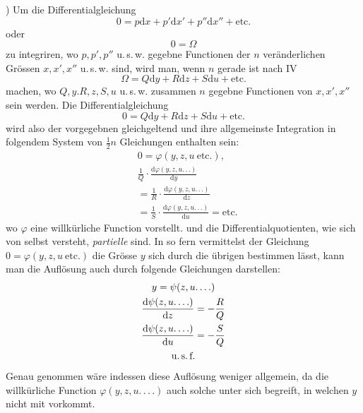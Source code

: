 ) Um die Differentialgleichung
\[
0=p\mathrm{d}x+p'\mathrm{d}x'+p''\mathrm{d}x''+\mathrm{etc.}
\]
oder
\[
0=\Omega
\]
zu integriren, wo $p,p',p''$ u.\,s.\,w. gegebne Functionen der $n$ veränderlichen
Grössen $x,x',x''$ u.\,s.\,w. sind, wird man, wenn $n$ gerade ist nach IV
\[
\Omega=Q\mathrm{d}y+R\mathrm{d}z+S\mathrm{d}u+\mathrm{etc.}
\]
machen, wo $Q,y.R,z,S,u$ u.\,s.\,w. zusammen $n$ gegebne Functionen von $x,x',x''$
sein werden. Die Differentialgleichung
\[
0=Q\mathrm{d}y+R\mathrm{d}z+S\mathrm{d}u+\mathrm{etc.}
\]
wird also der vorgegebnen gleichgeltend und ihre allgemeinste Integration in folgendem System von $\frac12 n$ Gleichungen enthalten sein:
\[
\begin{aligned}&0=\varphi(y,z,u\ \mathrm{etc.}),\\&
\frac1Q\cdot\frac{\mathrm{d}\varphi(y,z,u.\,.\,.)}{\mathrm{d}y}
\\&=\frac1R\cdot\frac{\mathrm{d}\varphi(y,z,u.\,.\,.)}{\mathrm{d}z}
\\&=\frac1S\cdot\frac{\mathrm{d}\varphi(y,z,u.\,.\,.)}{\mathrm{d}u}=\mathrm{etc.}\end{aligned}
\]
wo $\varphi$ eine willkürliche Function vorstellt. und die Differentialquotienten, wie
sich von selbst versteht, \textit{partielle} sind. In so fern vermittelst der Gleichung
$0=\varphi(y,z,u\ \mathrm{etc.})$ die Grösse $y$ sich durch die übrigen bestimmen lässt, kann
man die Auflösung auch durch folgende Gleichungen darstellen:
\[
\begin{gathered}
y=\psi(z,u.\,.\,.\,.)\\
\frac{\mathrm{d}\psi(z,u.\,.\,.\,.)}{\mathrm{d}z}=-\frac RQ\\
\frac{\mathrm{d}\psi(z,u.\,.\,.\,.)}{\mathrm{d}u}=-\frac SQ\\
\text{u.\,s.\,f.}
\end{gathered}
\]
Genau genommen wäre indessen diese Auflösung weniger allgemein, da die willkürliche Function $\varphi(y,z,u.\,.\,.\,.)$ auch solche unter sich begreift, in welchen $y$
nicht mit vorkommt.


